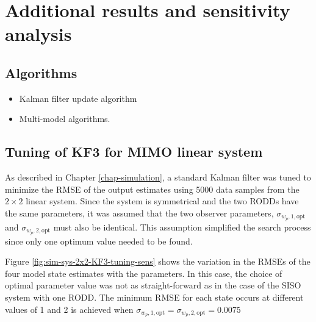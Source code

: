 \chapter{Additional results and sensitivity analysis}     %
\label{chap-Annex}                   %

\section{Algorithms} \label{section:annex-alg-KF}

\begin{itemize}
	\item Kalman filter update algorithm
	\item Multi-model algorithms.
\end{itemize}

\section{Tuning of KF3 for MIMO linear system} \label{section:annex-sim-2-KF-tuning}

As described in Chapter \ref{chap-simulation}, a standard Kalman filter was tuned to minimize the \gls{RMSE} of the output estimates using 5000 data samples from the $2\times2$ linear system. Since the system is symmetrical and the two \gls{RODD}s have the same parameters, it was assumed that the two observer parameters, $\sigma_{w_p,1,\text{opt}}$ and $\sigma_{w_p,2,\text{opt}}$ must also be identical. This assumption simplified the search process since only one optimum value needed to be found.

Figure \ref{fig:sim-sys-2x2-KF3-tuning-sens} shows the variation in the \gls{RMSE}s of the four model state estimates with the parameters. In this case, the choice of optimal parameter value was not as straight-forward as in the case of the SISO system with one \gls{RODD}. The minimum \gls{RMSE} for each state occurs at different values of  1 and 2 is achieved when $\sigma_{w_p,1,\text{opt}}=\sigma_{w_p,2,\text{opt}}=0.0075$

